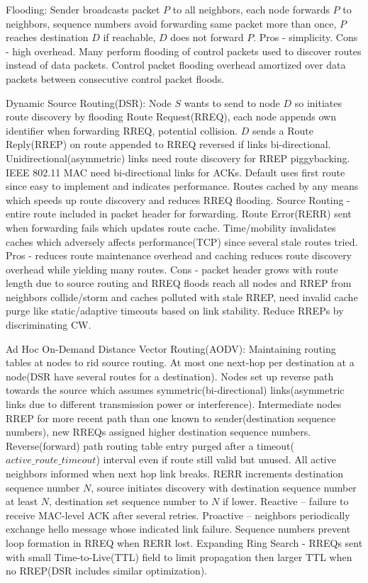 \documentclass[8pt]{extarticle}
\begin{document}
\begin{multicols}{2}
Flooding: Sender broadcasts packet $P$ to all neighbors, each node forwards $P$ to neighbors, sequence numbers avoid forwarding same packet more than once, $P$ reaches destination $D$ if reachable, $D$ does not forward  $P$. Pros - simplicity. Cons - high overhead. Many perform flooding of control packets used to discover routes instead of data packets. Control packet flooding overhead amortized over data packets between consecutive control packet floods.

Dynamic Source Routing(DSR): Node $S$ wants to send to node $D$ so initiates route discovery by flooding Route Request(RREQ), each node appends own identifier when forwarding RREQ, potential collision. $D$ sends a Route Reply(RREP) on route appended to RREQ reversed if links bi-directional. Unidirectional(asymmetric) links need route discovery for RREP piggybacking. IEEE 802.11 MAC need bi-directional links for ACKs. Default uses first route since easy to implement and indicates performance. Routes cached by any means which speeds up route discovery and reduces RREQ flooding. Source Routing - entire route included in packet header for forwarding. Route Error(RERR) sent when forwarding fails which updates route cache. Time/mobility invalidates caches which adversely affects performance(TCP) since several stale routes tried. Pros - reduces route maintenance overhead and caching reduces route discovery overhead while yielding many routes. Cons - packet header grows with route length due to source routing and RREQ floods reach all nodes and RREP from neighbors collide/storm and caches polluted with stale RREP, need invalid cache purge like static/adaptive timeouts based on link stability. Reduce RREPs by discriminating CW.

Ad Hoc On-Demand Distance Vector Routing(AODV): Maintaining routing tables at nodes to rid source routing. At most one next-hop per destination at a node(DSR have several routes for a destination). Nodes set up reverse path towards the source which assumes symmetric(bi-directional) links(asymmetric links due to different transmission power or interference). Intermediate nodes RREP for more recent path than one known to sender(destination sequence numbers), new RREQs assigned higher destination sequence numbers. Reverse(forward) path routing table entry purged after a timeout($active\_route\_timeout$) interval even if route still valid but unused. All active neighbors informed when next hop link breaks. RERR increments destination sequence number $N$, source initiates discovery with destination sequence number at least $N$, destination set sequence number to $N$ if lower. Reactive – failure to receive MAC-level ACK after several retries. Proactive – neighbors periodically exchange hello message whose indicated link failure. Sequence numbers prevent loop formation in RREQ when RERR lost. Expanding Ring Search - RREQs sent with small Time-to-Live(TTL) field to limit propagation then larger TTL when no RREP(DSR includes similar optimization).


\end{multicols}
\end{document}
